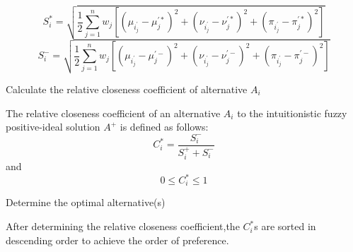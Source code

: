 \begin{flushleft}
\begin{steps}
\begin{equation}
    S_i^* = \sqrt{\frac{1}{2} \sum_{j=1}^{n} w_j [(\mu_i_j^{'}-\mu_j^{'*})^2 + (\nu_i_j^{'}-\nu_j^{'*})^2 +(\pi_i_j^{'}-\pi_j^{'*})^2]}
\end{equation}
\begin{equation}
    S_i^- = \sqrt{\frac{1}{2} \sum_{j=1}^{n} w_j [(\mu_i_j^{'}-\mu_j^{'-})^2 + (\nu_i_j^{'}-\nu_j^{'-})^2 +(\pi_i_j^{'}-\pi_j^{'-})^2]}
\end{equation}
\item Calculate the relative closeness coefficient of alternative $A_i$ 

The relative closeness coefficient of an alternative $A_i$
to the intuitionistic fuzzy positive-ideal solution
$A^+$ is defined as follows:
\begin{equation}
   C_i^*=\frac{S_i^-}{S_i^+ + S_i^-}
\end{equation}
and
\begin{equation*}
    0\leq C_i^*\leq 1
\end{equation*}

\item Determine the optimal alternative(s)   

After determining the relative closeness coefficient,the $C_i^*$s are sorted in descending order to achieve the order of preference.
\end{steps}
\end{flushleft}

